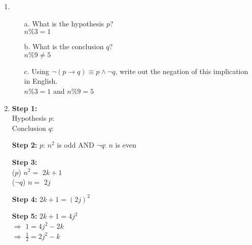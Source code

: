 
\newcommand{\laClass}       {CS 210}
\newcommand{\laSemester}    {Spring 2018}
\newcommand{\laChapter}     {2.5}
\newcommand{\laType}        {Exercise}
\newcommand{\laPoints}      {5}
\newcommand{\laTitle}       {Contradiction}
\newcommand{\laDate}        {}
\setcounter{chapter}{2}
\setcounter{section}{5}
\addtocounter{section}{-1}

\toggletrue{answerkey}





\begin{enumerate}
    \item
        \begin{enumerate}
            \item[a.]   What is the hypothesis $p$? \\
                {$n \% 3 = 1$}
                
            \item[b.]   What is the conclusion $q$? \\
                {$n \% 9 \neq 5$}
            
            \item[c.]   Using $\neg(p \to q) \equiv p \land \neg q$,
                write out the negation of this implication in English. \\
                $n \% 3 = 1$ and $n \% 9 = 5$
        \end{enumerate}

    \item
        \textbf{Step 1:}
            ~\\ \tab Hypothesis $p$:    
            ~\\ \tab Conclusion $q$:    
        
        \textbf{Step 2:}
                $p$: $n^{2}$ is odd
                AND \tab[0.5cm]
                $\neg q$: $n$ is even
                
        
        \textbf{Step 3:}
                ~\\ \tab ($p$) \tab $n^{2} = $ {$2k+1$}{}
                ~\\ \tab ($\neg q$) \tab $n = $ {$2j$}{}
        
        \textbf{Step 4:}
                $2k+1 = (2j)^{2}$
        
        \textbf{Step 5:}
                $2k + 1 = 4j^{2}$ \\ 
                \tab[0.5cm] $\Rightarrow$ \tab[0.5cm]
                $1 = 4j^{2} - 2k$ \\
                \tab[0.5cm] $\Rightarrow$ \tab[0.5cm]
                $\frac{1}{2} = 2j^{2} - k$
        

\end{enumerate}
